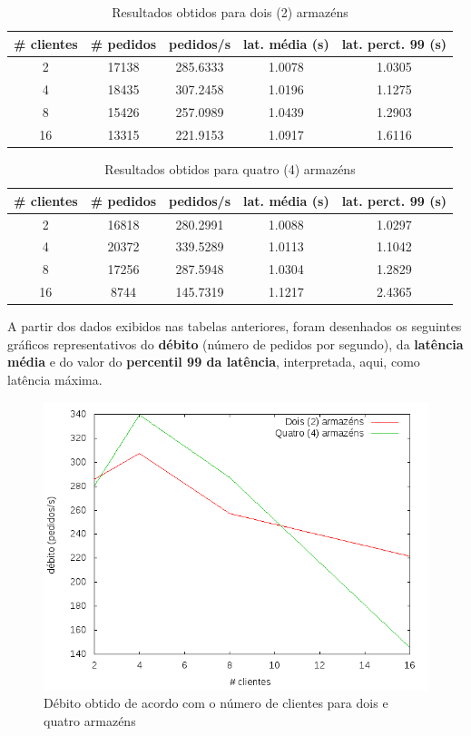 \begin{table}[!h]
\center
\small
\begin{tabular}{|c|c|c|c|c|}
\hline
\textbf{\# clientes} & \textbf{\# pedidos} & \textbf{pedidos/s} & \textbf{lat. média (s)} & \textbf{lat. perct. 99 (s)}  \\ \hline
2 & 17138 & 285.6333 & 1.0078 & 1.0305  \\ \hline
4 & 18435 & 307.2458 & 1.0196 & 1.1275  \\ \hline
8 & 15426 & 257.0989 & 1.0439 & 1.2903  \\ \hline
16 & 13315 & 221.9153 & 1.0917 & 1.6116  \\ \hline
\end{tabular}
\caption{Resultados obtidos para dois (2) armazéns}
\end{table}

\begin{table}[!h]
\center
\small
\begin{tabular}{|c|c|c|c|c|}
\hline
\textbf{\# clientes} & \textbf{\# pedidos} & \textbf{pedidos/s} & \textbf{lat. média (s)} & \textbf{lat. perct. 99 (s)}  \\ \hline
2 & 16818 & 280.2991 & 1.0088 & 1.0297  \\ \hline
4 & 20372 & 339.5289 & 1.0113 & 1.1042  \\ \hline
8 & 17256 & 287.5948 & 1.0304 & 1.2829  \\ \hline
16 & 8744 & 145.7319 & 1.1217 & 2.4365  \\ \hline
\end{tabular}
\caption{Resultados obtidos para quatro (4) armazéns}
\end{table}

A partir dos dados exibidos nas tabelas anteriores, foram desenhados os seguintes gráficos representativos do \textbf{débito} (número de pedidos por segundo), da \textbf{latência média} e do valor do \textbf{percentil 99 da latência}, interpretada, aqui, como latência máxima.

\begin{figure}[!h]
\centering
\includegraphics[scale=.4]{img/questao-1/rep-read-deb}
\caption{Débito obtido de acordo com o número de clientes para dois e quatro armazéns}
\end{figure}

